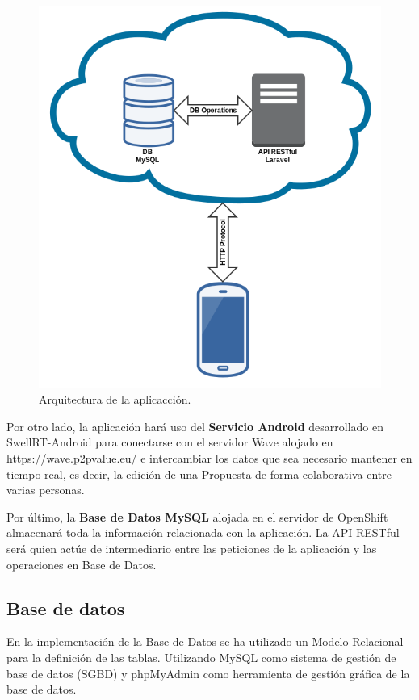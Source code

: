 \begin{figure}[H]
\centering
\includegraphics[keepaspectratio, scale=0.4]{Media/Captures/architecture.png}
\caption{Arquitectura de la aplicacción.}
\label{fig:architecture}
\end{figure}

Por otro lado, la aplicación hará uso del \textbf{Servicio Android} desarrollado en SwellRT-Android \cite{ref:swellRT_android_github} para conectarse con el servidor Wave alojado en https://wave.p2pvalue.eu/ e intercambiar los datos que sea necesario mantener en tiempo real, es decir, la edición de una Propuesta de forma colaborativa entre varias personas.

Por último, la \textbf{Base de Datos MySQL} alojada en el servidor de OpenShift almacenará toda la información relacionada con la aplicación. La API RESTful será quien actúe de intermediario entre las peticiones de la aplicación y las operaciones en Base de Datos.

\subsection{Base de datos}

En la implementación de la Base de Datos se ha utilizado un Modelo Relacional para la definición de las tablas. Utilizando MySQL \cite{ref:MySQL} como sistema de gestión de base de datos (SGBD) y phpMyAdmin \cite{ref:phpMyAdmin} como herramienta de gestión gráfica de la base de datos.

